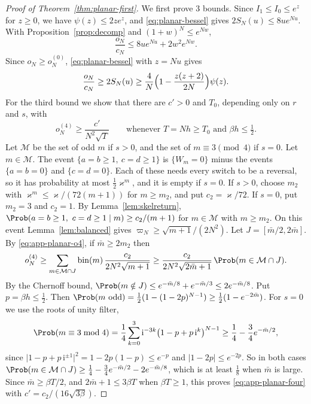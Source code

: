\begin{proof}[Proof of Theorem~\ref{thm:planar-first}]
We first prove 3 bounds. Since $I_1\le I_0\le e^z$ for $z\ge0$, we have $\psi(z)\le2ze^z$, and
\eqref{eq:planar-bessel} gives $2S_N(u)\le8ue^{Nu}$. With Proposition~\ref{prop:decomp} and
$(1+w)^N\le e^{Nw}$,
\begin{equation}\label{eq:app-planar-upper}
 \frac{o_N}{c_N}\le8ue^{Nu}+2w^2e^{Nw}.
\end{equation}
Since $o_N\ge o^{(0)}_N$, \eqref{eq:planar-bessel} with $z=Nu$ gives
\begin{equation}\label{eq:app-planar-axes}
 \frac{o_N}{c_N}\ge2S_N(u)\ge\frac4N\Bigl(1-\frac{z(z+2)}{2N}\Bigr)\psi(z).
\end{equation}
For the third bound we show that there are $c'>0$ and $T_0$, depending only on $r$ and $s$, with
\begin{equation}\label{eq:app-planar-four}
 o^{(4)}_N\ge\frac{c'}{N^2\sqrt T}\qquad\text{whenever }T=Nh\ge T_0\text{ and }\beta h\le\tfrac12 .
\end{equation}
Let $\mathcal M$ be the set of odd $m$ if $s>0$, and the set of $m\equiv3\pmod4$ if $s=0$. Let
$m\in\mathcal M$. The event $\{a=b\ge1,\ c=d\ge1\}$ is $\{W_m=0\}$ minus the events $\{a=b=0\}$ and
$\{c=d=0\}$. Each of these needs every switch to be a reversal, so it has probability at most
$\frac12\varkappa^m$, and it is empty if $s=0$. If $s>0$, choose $m_2$ with
$\varkappa^m\le\varkappa/(72(m+1))$ for $m\ge m_2$, and put $c_2=\varkappa/72$. If $s=0$, put
$m_2=3$ and $c_2=1$. By Lemma~\ref{lem:skelreturn}, $\Prob(a=b\ge1,\ c=d\ge1\mid m)\ge c_2/(m+1)$
for $m\in\mathcal M$ with $m\ge m_2$. On this event Lemma~\ref{lem:balanced} gives
$\varpi_N\ge\sqrt{m+1}/(2N^2)$. Let $J=[\bar m/2,2\bar m]$. By \eqref{eq:app-planar-o4}, if
$\bar m\ge2m_2$ then
\[
 o^{(4)}_N\ge\sum_{m\in\mathcal M\cap J}\mathrm{bin}(m)\,\frac{c_2}{2N^2\sqrt{m+1}}
 \ge\frac{c_2}{2N^2\sqrt{2\bar m+1}}\,\Prob(m\in\mathcal M\cap J).
\]
By the Chernoff bound, $\Prob(m\notin J)\le e^{-\bar m/8}+e^{-\bar m/3}\le2e^{-\bar m/8}$. Put
$p=\beta h\le\frac12$. Then $\Prob(m\text{ odd})=\frac12(1-(1-2p)^{N-1})\ge\frac12(1-e^{-2\bar m})$.
For $s=0$ we use the roots of unity filter,
\[
 \Prob(m\equiv3\bmod4)=\frac14\sum_{k=0}^3\mathrm i^{-3k}\bigl(1-p+p\,\mathrm i^k\bigr)^{N-1}
 \ge\frac14-\frac34e^{-\bar m/2},
\]
since $\lvert1-p+p\,\mathrm i^{\pm1}\rvert^2=1-2p(1-p)\le e^{-p}$ and $\lvert1-2p\rvert\le e^{-2p}$. So in
both cases $\Prob(m\in\mathcal M\cap J)\ge\frac14-\frac34e^{-\bar m/2}-2e^{-\bar m/8}$, which is at
least $\frac18$ when $\bar m$ is large. Since $\bar m\ge\beta T/2$, and $2\bar m+1\le3\beta T$ when
$\beta T\ge1$, this proves \eqref{eq:app-planar-four} with $c'=c_2/(16\sqrt{3\beta})$.


\end{proof}
